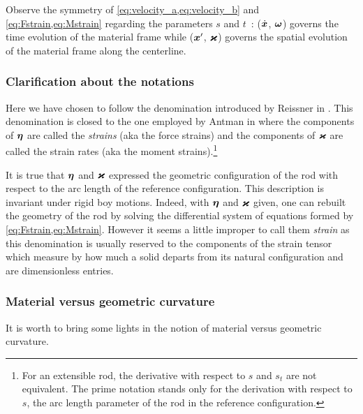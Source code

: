 Observe the symmetry of \cref{eq:velocity_a,eq:velocity_b} and \cref{eq:Fstrain,eq:Mstrain} regarding the parameters $s$ and $t$~: ($\dot{\boldsymbol{x}}$, $\boldsymbol{\omega}$) governs the time evolution of the material frame while ($\boldsymbol{x}'$, $\boldsymbol{\varkappa}$) governs the spatial evolution of the material frame along the centerline.

\subsubsection{Clarification about the notations}
Here we have chosen to follow the denomination introduced by Reissner in \cite{Reissner1973}. This denomination is closed to the one employed by Antman in \cite[p.~284]{Antman2005} where the components of $\boldsymbol{\eta}$ are called the \emph{strains} (aka the force strains) and the components of $\boldsymbol{\varkappa}$ are called the strain rates (aka the moment strains).\footnote{For an extensible rod, the derivative with respect to $s$ and $s_t$ are not equivalent. The prime notation stands only for the derivation with respect to $s$, the arc length parameter of the rod in the reference configuration.}

It is true that $\boldsymbol{\eta}$ and $\boldsymbol{\varkappa}$ expressed the geometric configuration of the rod with respect to the arc length of the reference configuration. This description is invariant under rigid boy motions. Indeed, with $\boldsymbol{\eta}$ and $\boldsymbol{\varkappa}$ given, one can rebuilt the geometry of the rod by solving the differential system of equations formed by \cref{eq:Fstrain,eq:Mstrain}. However it seems a little improper to call them \emph{strain} as this denomination is usually reserved to the components of the strain tensor which measure by how much a solid departs from its natural configuration and are dimensionless entries.

\subsubsection{Material versus geometric curvature}

It is worth to bring some lights in the notion of material versus geometric curvature.

